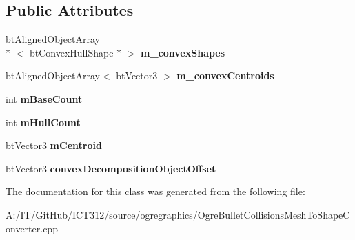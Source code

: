 \subsection*{Public Attributes}
\begin{DoxyCompactItemize}
\item 
\hypertarget{class_my_convex_decomposition_a6c7e2375dbc914f33750f9c59b3cd599}{bt\-Aligned\-Object\-Array\\*
$<$ bt\-Convex\-Hull\-Shape $\ast$ $>$ {\bfseries m\-\_\-convex\-Shapes}}\label{class_my_convex_decomposition_a6c7e2375dbc914f33750f9c59b3cd599}

\item 
\hypertarget{class_my_convex_decomposition_abb3bf59567cac3c5ddc948b0fecb04ae}{bt\-Aligned\-Object\-Array$<$ bt\-Vector3 $>$ {\bfseries m\-\_\-convex\-Centroids}}\label{class_my_convex_decomposition_abb3bf59567cac3c5ddc948b0fecb04ae}

\item 
\hypertarget{class_my_convex_decomposition_a387f1cbfa3161db25dbaeaf60cf1e6dd}{int {\bfseries m\-Base\-Count}}\label{class_my_convex_decomposition_a387f1cbfa3161db25dbaeaf60cf1e6dd}

\item 
\hypertarget{class_my_convex_decomposition_a1e14fdd3dc8255dc5d77fb0a17f528e5}{int {\bfseries m\-Hull\-Count}}\label{class_my_convex_decomposition_a1e14fdd3dc8255dc5d77fb0a17f528e5}

\item 
\hypertarget{class_my_convex_decomposition_a39a3749d2d7c5643aec6ee178fd65fdb}{bt\-Vector3 {\bfseries m\-Centroid}}\label{class_my_convex_decomposition_a39a3749d2d7c5643aec6ee178fd65fdb}

\item 
\hypertarget{class_my_convex_decomposition_a22783181be65e4e9c9a94f74cfb6a012}{bt\-Vector3 {\bfseries convex\-Decomposition\-Object\-Offset}}\label{class_my_convex_decomposition_a22783181be65e4e9c9a94f74cfb6a012}

\end{DoxyCompactItemize}


The documentation for this class was generated from the following file\-:\begin{DoxyCompactItemize}
\item 
A\-:/\-I\-T/\-Git\-Hub/\-I\-C\-T312/source/ogregraphics/Ogre\-Bullet\-Collisions\-Mesh\-To\-Shape\-Converter.\-cpp\end{DoxyCompactItemize}
